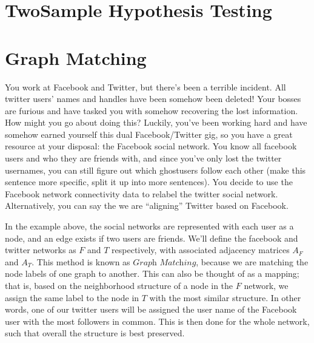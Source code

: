 \documentclass[letterpaper,10pt,english]{jupyterBook}
\begin{document}
\section{Two\sphinxhyphen{}Sample Hypothesis Testing}
\label{\detokenize{applications/ch9/two-sample-hypothesis:two-sample-hypothesis-testing}}\label{\detokenize{applications/ch9/two-sample-hypothesis::doc}}

\section{Graph Matching}
\label{\detokenize{applications/ch9/graph-matching-vertex:graph-matching}}\label{\detokenize{applications/ch9/graph-matching-vertex::doc}}
\sphinxAtStartPar
You work at Facebook and Twitter, but there’s been a terrible incident. All twitter users’ names and handles have been somehow been deleted! Your bosses are furious and have tasked you with somehow recovering the lost information. How might you go about doing this? Luckily, you’ve been working hard and have somehow earned yourself this dual Facebook/Twitter gig, so you have a great resource at your disposal: the Facebook social network. You know all facebook users and who they are friends with, and since you’ve only lost the twitter usernames, you can still figure out which ghost\sphinxhyphen{}users follow each other (make this sentence more specific, split it up into more sentences). You decide to use the Facebook network connectivity data to re\sphinxhyphen{}label the twitter social network. Alternatively, you can say the we are “aligning” Twitter based on Facebook.

\sphinxAtStartPar
In the example above, the social networks are represented with each user as a node, and an edge exists if two users are friends. We’ll define the facebook and twitter networks as \(F\) and \(T\) respectively, with associated adjacency matrices \(A_F\) and \(A_T\). This method is known as \(\textit{Graph Matching}\), because we are matching the node labels of one graph to another. This can also be thought of as a mapping; that is, based on the neighborhood structure of a node in the \(F\) network, we assign the same label to the node in \(T\) with the most similar structure. In other words, one of our twitter users will be assigned the user name of the Facebook user with the most followers in common. This is then done for the whole network, such that overall the structure is best preserved.
\end{document}
